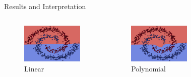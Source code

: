 \documentclass[9.5pt]{beamer}
\begin{document}
    \begin{frame}[fragile]{Results and Interpretation}
        \bigskip
        \bigskip
        \begin{columns}[onlytextwidth]
            \scriptsize
            \centering
            \begin{figure}
                \centering
                \includegraphics[width=\linewidth]{image-20220624192228376}
                \caption{Linear}
            \end{figure}
            \centering
            \begin{figure}
                \centering
                \includegraphics[width=\linewidth]{image-20220624192244841}
                \caption{Polynomial}
            \end{figure}
            \centering
            \begin{figure}

\end{figure}
\end{columns}
\end{frame}
\end{document}
